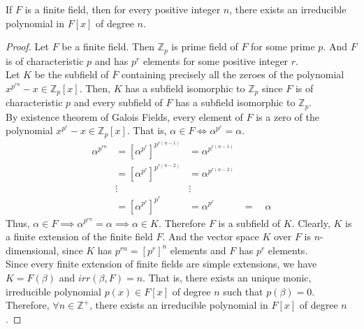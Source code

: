 \begin{corollary}
	If $F$ is a finite field, then for every positive integer $n$, there exists an irreducible polynomial in $F[x]$ of degree $n$.
\end{corollary}
\begin{proof}
	Let $F$ be a finite field.
	Then $\mathbb{Z}_p$ is prime field of $F$ for some prime $p$.
	And $F$ is of characteristic $p$ and has $p^r$ elements for some positive integer $r$.\\ %


	Let $K$ be the subfield of $\overline{F}$ containing precisely all the zeroes of the polynomial $x^{p^{rn}}-x \in \mathbb{Z}_p[x]$.
	Then, $K$ has a subfield isomorphic to $\mathbb{Z}_p$ since $F$ is of characteristic $p$ and every subfield of $F$ has a subfield isomorphic to $\mathbb{Z}_p$.\\

	By existence theorem of Galois Fields, every element of $F$ is a zero of the polynomial $x^{p^r}-x \in \mathbb{Z}_p[x]$.
	That is, $\alpha \in F \iff \alpha^{p^r} = \alpha$.
	\begin{align*}
		\alpha^{p^{rn}} & = \left[\alpha^{p^r}\right]^{p^{r(n-1)}} & =  \alpha^{p^{r(n-1)}} & \\
		& = \left[\alpha^{p^r}\right]^{p^{r(n-2)}} & =  \alpha^{p^{r(n-2)}} & \\
		& \vdots & \vdots & \\
		& = \left[\alpha^{p^r}\right]^{p^r} & = \alpha^{p^r} & = \quad \alpha
	\end{align*}
	Thus, $\alpha \in F \implies \alpha^{p^{rn}} = \alpha \implies \alpha \in K$.
	Therefore $F$ is a subfield of $K$.
	Clearly, $K$ is a finite extension of the finite field $F$.
	And the vector space $K$ over $F$ is $n$-dimensional, since $K$ has $p^{rn} = [p^r]^n$ elements and $F$ has $p^r$ elements.\\
	
	Since every finite extension of finite fields are simple extensions, we have $K = F(\beta)$ and $irr(\beta,F) = n$.
	That is, there exists an unique monic, irreducible polynomial $p(x) \in F[x]$ of degree $n$ such that $p(\beta) = 0$.
	Therefore, $\forall n \in \mathbb{Z}^+$, there exists an irreducible polynomial in $F[x]$ of degree $n$.
\end{proof}


